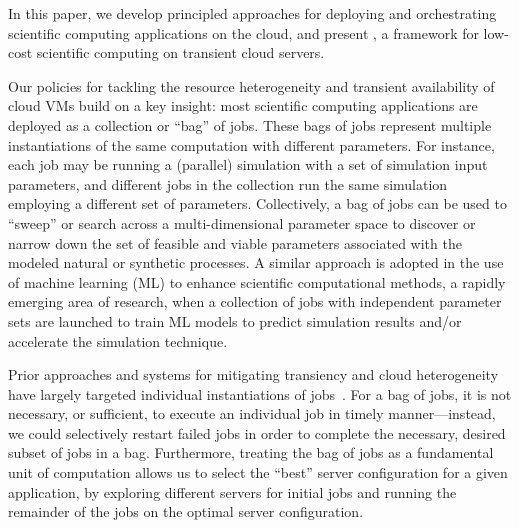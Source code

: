 In this paper, we develop principled approaches for deploying and orchestrating  scientific computing applications on the cloud, and present \sysname, a framework for low-cost scientific computing on  transient cloud servers.

%
%
Our policies for tackling the resource heterogeneity and transient availability of cloud VMs build on a key insight: most scientific computing applications are deployed as a collection or ``bag'' of jobs. 
%
These bags of jobs represent multiple instantiations of the same computation with different parameters. 
%
For instance, each job may be running a (parallel) simulation with a set of simulation input parameters, and different jobs in the collection run the same simulation employing a different set of  parameters. 
Collectively, a bag of jobs can be used to ``sweep'' or search across a multi-dimensional parameter space to discover or narrow down the set of feasible and viable parameters associated with the modeled natural or synthetic processes. A similar approach is adopted in the use of machine learning (ML) to enhance scientific computational methods, a rapidly emerging area of research, when a collection of jobs with independent parameter sets are launched to train ML models to predict simulation results and/or accelerate the simulation technique.

Prior approaches and systems for mitigating transiency and cloud heterogeneity have largely targeted individual instantiations of jobs~\cite{spoton, exosphere, flint, marathe2014exploiting}. 
%
For a bag of jobs, it is not necessary, or sufficient, to execute an individual job in timely manner---instead, we could selectively restart failed jobs in order to complete the necessary, desired subset of jobs in a bag. 
%
Furthermore, treating the bag of jobs as a fundamental unit of computation allows us to select the ``best'' server configuration for a given application, by exploring different servers for initial jobs and running the remainder of the jobs on the optimal server configuration.


